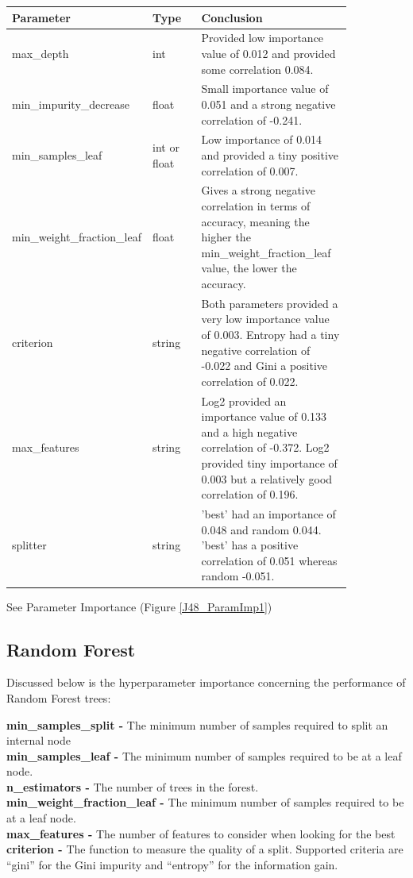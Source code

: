 \documentclass[11pt]{article}
\begin{document}
\begin{table}[h]
  \centering
  \begin{tabular}{|p{0.25\linewidth} | p{0.15 \linewidth} | p{0.45\linewidth}|} 
    \hline
    \textbf{Parameter}  & \textbf{Type} &\textbf{Conclusion} \\ \hline
    max\_depth & int & Provided low importance value of 0.012 and provided some correlation 0.084. \\ \hline
    min\_impurity\_decrease & float & Small importance value of 0.051 and a strong negative correlation of -0.241.  \\ \hline
    min\_samples\_leaf & int or float & Low importance of 0.014 and provided a tiny positive correlation of 0.007. \\ \hline
    min\_weight\_fraction\_leaf & float & Gives a strong negative correlation in terms of accuracy, meaning the higher the min\_weight\_fraction\_leaf value, the lower the accuracy.\\ \hline
    criterion & string & Both parameters provided a very low importance value of 0.003. Entropy had a tiny negative correlation of -0.022 and Gini a positive correlation of 0.022. \\ \hline
    max\_features & string & Log2 provided an importance value of 0.133 and a high negative correlation of -0.372. Log2 provided tiny importance of 0.003 but a relatively good correlation of 0.196. \\ \hline
    splitter & string & 'best' had an importance of 0.048 and random 0.044. 'best' has a positive correlation of 0.051 whereas random -0.051. \\ \hline
  \end{tabular}
\end{table}\label{RF_Analysis_Table}
See Parameter Importance (Figure \ref{J48_ParamImp1})
\FloatBarrier

\newpage
\subsection{Random Forest}
Discussed below is the hyperparameter \cite{SklearnEnsembleRandomForestClassifier} importance concerning the performance of Random Forest trees:

\par
\textbf{min\_samples\_split -} The minimum number of samples required to split an internal node \\
\textbf{min\_samples\_leaf -} The minimum number of samples required to be at a leaf node.  \\
\textbf{n\_estimators -} The number of trees in the forest.\\
\textbf{min\_weight\_fraction\_leaf -} The minimum number of samples required to be at a leaf node. \\
\textbf{max\_features -} The number of features to consider when looking for the best \\
\textbf{criterion -} The function to measure the quality of a split. Supported criteria are “gini” for the Gini impurity and “entropy” for the information gain. \\
\end{document}

